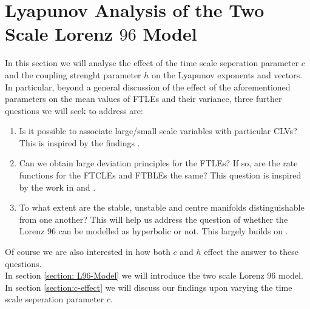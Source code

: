 \section{Lyapunov Analysis of the Two Scale Lorenz $96$ Model}

In this section we will analyse the effect of the time scale seperation parameter $c$ and the coupling strenght parameter $h$ on the Lyapunov exponents and vectors. In particular, beyond a general discussion of the effect of the aforementioned parameters on the mean values of FTLEs and their variance, three further questions we will seek to address are:

\begin{enumerate}
    \item Is it possible to associate large/small scale variables with particular CLVs? This is inspired by the findings \cite{Vannitsem2016}.
    \item Can we obtain large deviation principles for the FTLEs? If so, are the rate functions for the FTCLEs and FTBLEs the same? This question is inspired by the work in \cite{Vannitsem2016} and \cite{DeCruz2018}.
    \item To what extent are the stable, unstable and centre manifolds distinguishable from one another? This will help us address the question of whether the Lorenz $96$ can be modelled as hyperbolic or not. This largely builds on \cite{Carlu2019}.
\end{enumerate}

Of course we are also interested in how both $c$ and $h$ effect the answer to these questions.\\

In section \ref{section: L96-Model} we will introduce the two scale Lorenz $96$ model.\\

In section \ref{section:c-effect} we will discuss our findings upon varying the time scale seperation parameter $c$.
